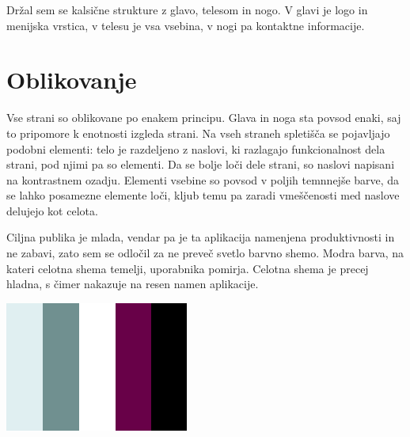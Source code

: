\documentclass[12pt]{article}
\begin{document}
Držal sem se kalsične strukture z glavo, telesom in nogo. V glavi je logo in menijska vrstica, v telesu je vsa vsebina, v nogi pa kontaktne informacije.

\newpage
\section{Oblikovanje}
Vse strani so oblikovane po enakem principu. Glava in noga sta povsod enaki, saj to pripomore k enotnosti izgleda strani. Na vseh straneh spletišča se pojavljajo podobni elementi: telo je razdeljeno z naslovi, ki razlagajo funkcionalnost dela strani, pod njimi pa so elementi. Da se bolje loči dele strani, so naslovi napisani na kontrastnem ozadju. Elementi vsebine so povsod v poljih temnnejše barve, da se lahko posamezne elemente loči, kljub temu pa zaradi vmeščenosti med naslove delujejo kot celota.

Ciljna publika je mlada, vendar pa je ta aplikacija namenjena produktivnosti in ne zabavi, zato sem se odločil za ne preveč svetlo barvno shemo. Modra barva, na kateri celotna shema temelji, uporabnika pomirja. Celotna shema je precej hladna, s čimer nakazuje na resen namen aplikacije. 

\vspace{15pt}

\includegraphics[scale=1.5]{barvna_shema.png}
\end{document}
